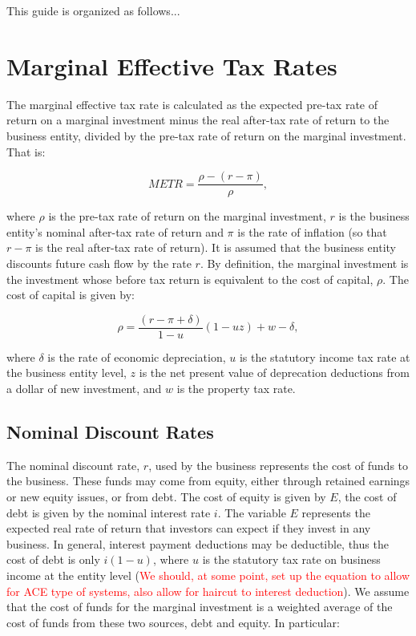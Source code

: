 \documentclass[article,11pt,letterpaper,fleqn]{article}
\theoremstyle{definition}
\numberwithin{equation}{section}
\begin{document}
This guide is organized as follows...

\section{Marginal Effective Tax Rates}

The marginal effective tax rate is calculated as the expected pre-tax rate of return on a marginal investment minus the real after-tax rate of return to the business entity, divided by the pre-tax rate of return on the marginal investment.  That is: 

\begin{equation}
METR = \frac{\rho - (r-\pi)}{\rho},
\end{equation}

\noindent\noindent where $\rho$ is the pre-tax rate of return on the marginal investment, $r$ is the business entity's nominal after-tax rate of return and $\pi$ is the rate of inflation (so that $r-\pi$ is the real after-tax rate of return).  It is assumed that the business entity discounts future cash flow by the rate $r$.  By definition, the marginal investment is the investment whose before tax return is equivalent to the cost of capital, $\rho$.  The cost of capital is given by:

\begin{equation}
\rho = \frac{(r-\pi+\delta)}{1-u}(1-uz)+w-\delta,
\end{equation}  

\noindent\noindent where $\delta$ is the rate of economic depreciation, $u$ is the statutory income tax rate at the business entity level, $z$ is the net present value of deprecation deductions from a dollar of new investment, and $w$ is the property tax rate.  

\subsection{Nominal Discount Rates}

The nominal discount rate, $r$, used by the business represents the cost of funds to the business.  These funds may come from equity, either through retained earnings or new equity issues, or from debt.  The cost of equity is given by $E$, the cost of debt is given by the nominal interest rate $i$.  The variable $E$ represents the expected real rate of return that investors can expect if they invest in any business.  In general, interest payment deductions may be deductible, thus the cost of debt is only $i(1-u)$, where $u$ is the statutory tax rate on business income at the entity level (\textcolor{red}{We should, at some point, set up the equation to allow for ACE type of systems, also allow for haircut to interest deduction}).  We assume that the cost of funds for the marginal investment is a weighted average of the cost of funds from these two sources, debt and equity.  In particular:
\end{document}
